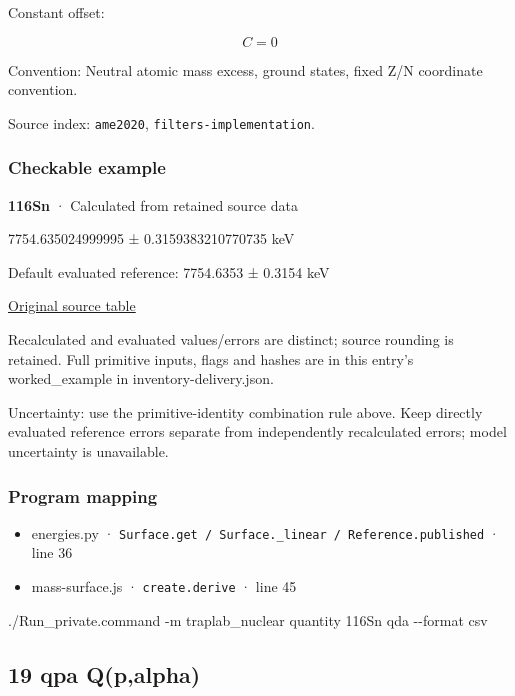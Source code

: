 \documentclass[
  11pt,
  letterpaper,
]{article}
\newenvironment{Shaded}{}{}
\newcommand{\AttributeTok}[1]{\textcolor[rgb]{0.49,0.56,0.16}{#1}}
\newcommand{\ExtensionTok}[1]{#1}
\newcommand{\NormalTok}[1]{#1}
\providecommand{\tightlist}{%
  \setlength{\itemsep}{0pt}\setlength{\parskip}{0pt}}
\begin{document}
Constant offset:

\[
C=0
\]

Convention: Neutral atomic mass excess, ground states, fixed Z/N
coordinate convention.

Source index: \texttt{ame2020}, \texttt{filters-implementation}.

\subsubsection{Checkable example}\label{checkable-example-17}

\textbf{116Sn} · Calculated from retained source data

7754.635024999995 ± 0.3159383210770735 keV

Default evaluated reference: 7754.6353 ± 0.3154 keV

\href{https://www-nds.iaea.org/amdc/ame2020/rct2_1.mas20.txt}{Original
source table}

Recalculated and evaluated values/errors are distinct; source rounding
is retained. Full primitive inputs, flags and hashes are in this entry's
worked\_example in inventory-delivery.json.

Uncertainty: use the primitive-identity combination rule above. Keep
directly evaluated reference errors separate from independently
recalculated errors; model uncertainty is unavailable.

\subsubsection{Program mapping}\label{program-mapping-17}

\begin{itemize}
\tightlist
\item
  energies.py ·
  \texttt{Surface.get\ /\ Surface.\_linear\ /\ Reference.published} ·
  line 36
\item
  mass-surface.js · \texttt{create.derive} · line 45
\end{itemize}

\begin{Shaded}
\begin{Highlighting}[]
\ExtensionTok{./Run\_private.command} \AttributeTok{{-}m}\NormalTok{ traplab\_nuclear quantity 116Sn qda }\AttributeTok{{-}{-}format}\NormalTok{ csv}
\end{Highlighting}
\end{Shaded}

\subsection{19 qpa Q(p,alpha)}\label{qpa-qpalpha}
\end{document}
